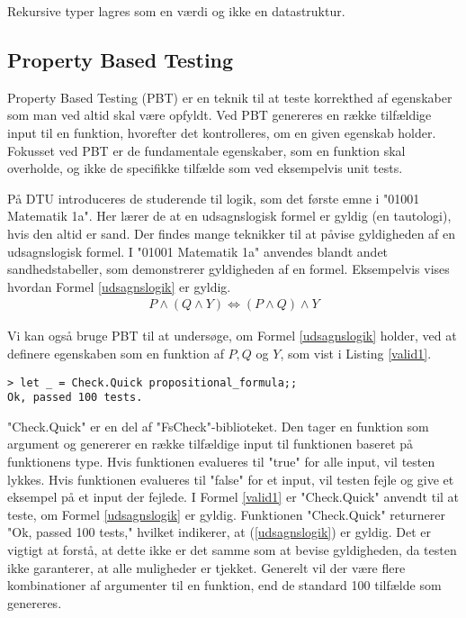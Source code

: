 Rekursive typer lagres som en værdi og ikke en datastruktur.


\subsection{Property Based Testing}
Property Based Testing (PBT) er en teknik til at teste korrekthed af egenskaber som man ved altid skal være opfyldt. Ved PBT genereres en række tilfældige input til en funktion, hvorefter det kontrolleres, om en given egenskab holder. Fokusset ved PBT er de fundamentale egenskaber, som en funktion skal overholde, og ikke de specifikke tilfælde som ved eksempelvis unit tests.

På DTU introduceres de studerende til logik, som det første emne i "01001 Matematik 1a". Her lærer de at en udsagnslogisk formel er gyldig (en tautologi), hvis den altid er sand. Der findes mange teknikker til at påvise gyldigheden af en udsagnslogisk formel. I "01001 Matematik 1a" anvendes blandt andet sandhedstabeller, som demonstrerer gyldigheden af en formel. Eksempelvis vises hvordan Formel \eqref{udsagnslogik} er gyldig.
\begin{gather}
    P \land (Q \land Y) \iff (P \land Q) \land Y
    \label{udsagnslogik}
\end{gather}

Vi kan også bruge PBT til at undersøge, om Formel \eqref{udsagnslogik} holder, ved at definere egenskaben som en funktion af $P, Q$ og $Y$, som vist i Listing \ref{valid1}.




\begin{lstlisting}[style=output, label={lst:output_example}, caption={Output ved PBT af (\ref{udsagnslogik})}]
> let _ = Check.Quick propositional_formula;;
Ok, passed 100 tests.
\end{lstlisting}

"Check.Quick" er en del af "FsCheck"-biblioteket. Den tager en funktion som argument og genererer en række tilfældige input til funktionen baseret på funktionens type. Hvis funktionen evalueres til "true" for alle input, vil testen lykkes. Hvis funktionen evalueres til "false" for et input, vil testen fejle og give et eksempel på et input der fejlede. I Formel \ref{valid1} er "Check.Quick" anvendt til at teste, om Formel \eqref{udsagnslogik} er gyldig. Funktionen "Check.Quick" returnerer "Ok, passed 100 tests," hvilket indikerer, at (\ref{udsagnslogik}) er gyldig. Det er vigtigt at forstå, at dette ikke er det samme som at bevise gyldigheden, da testen ikke garanterer, at alle muligheder er tjekket. Generelt vil der være flere kombinationer af argumenter til en funktion, end de standard 100 tilfælde som genereres.


